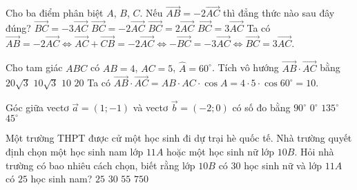 \begin{ex}%
	Cho ba điểm phân biệt $A$, $B$, $C$. Nếu $\overrightarrow{AB}=-2\overrightarrow{AC}$ thì đẳng thức nào sau đây đúng?
	\choice
	{$\overrightarrow{BC}=-3\overrightarrow{AC}$}
	{$\overrightarrow{BC}=-2\overrightarrow{AC}$}
	{$\overrightarrow{BC}=2\overrightarrow{AC}$}
	{\True $\overrightarrow{BC}=3\overrightarrow{AC}$}
	\loigiai
	{Ta có $\overrightarrow{AB}=-2\overrightarrow{AC}\Leftrightarrow \overrightarrow{AC}+\overrightarrow{CB}=-2\overrightarrow{AC}\Leftrightarrow -\overrightarrow{BC}=-3\overrightarrow{AC}\Leftrightarrow \overrightarrow{BC}=3\overrightarrow{AC}$.}
\end{ex}

\begin{ex}%
	Cho tam giác $ABC$ có $AB=4$, $AC=5$, $\widehat{A}=60^\circ$. Tích vô hướng $\overrightarrow{AB}\cdot \overrightarrow{AC}$ bằng
	\choice
	{$20\sqrt{3}$}
	{$10\sqrt{3}$}
	{\True $10$}
	{$20$}
	\loigiai
	{Ta có $\overrightarrow{AB}\cdot\overrightarrow{AC}=AB\cdot AC\cdot \cos A=4 \cdot 5 \cdot \cos 60^\circ=10$.}
\end{ex}

\begin{ex}%
	Góc giữa vectơ $\overrightarrow{a}=(1;-1)$ và vectơ $\overrightarrow{b}=(-2;0)$ có số đo bằng
	\choice
	{$90^\circ$}
	{$0^\circ$}
	{\True $135^\circ$}
	{$45^\circ$}
\end{ex}

\begin{ex}%
	Một trường THPT được cử một học sinh đi dự trại hè quốc tế. Nhà trường quyết định chọn một học sinh nam lớp $11A$ hoặc một học sinh nữ lớp $10B$. Hỏi nhà trường có bao nhiêu cách chọn, biết rằng lớp $10B$ có $30$ học sinh nữ và lớp $11A$ có $25$ học sinh nam?
	\choice
	{$25$}
	{$30$}
	{\True $55$}
	{$750$}
\end{ex}

